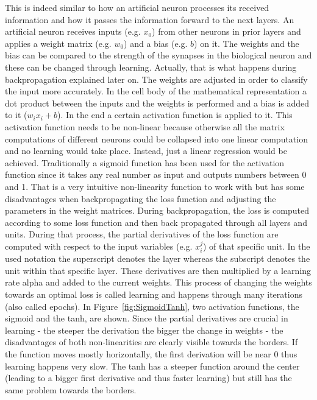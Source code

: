 This is indeed similar to how an artificial neuron processes its received information and how it passes the information forward to the next layers. An artificial neuron receives inputs (e.g. $x_0$) from other neurons in prior layers and applies a weight matrix (e.g. $w_0$) and a bias (e.g. $b$) on it. The weights and the bias can be compared to the strength of the synapses in the biological neuron and these can be changed through learning. Actually, that is what happens during backpropagation explained later on. The weights are adjusted in order to classify the input more accurately. In the cell body of the mathematical representation a dot product between the inputs and the weights is performed and a bias is added to it ($w_i x_i + b$). In the end a certain activation function is applied to it. This activation function needs to be non-linear because otherwise all the matrix computations of different neurons could be collapsed into one linear computation and no learning would take place. Instead, just a linear regression would be achieved.
Traditionally a sigmoid function has been used for the activation function since it takes any real number as input and outputs numbers between 0 and 1. That is a very intuitive non-linearity function to work with but has some disadvantages when backpropagating the loss function and adjusting the parameters in the weight matrices.  During backpropagation, the loss is computed according to some loss function and then back propagated through all layers and units. During that process, the partial derivatives of the loss function are computed with respect to the input variables (e.g. $x_i^j$) of that specific unit. In the used notation the superscript denotes the layer whereas the subscript denotes the unit within that specific layer. These derivatives are then multiplied by a learning rate alpha and added to the current weights. This process of changing the weights towards an optimal loss is called learning and happens through many iterations (also called epochs). In Figure~\ref{fig:SigmoidTanh}, two activation functions, the sigmoid and the tanh, are shown. Since the partial derivatives are crucial in learning - the steeper the derivation the bigger the change in weights - the disadvantages of both non-linearities are clearly visible towards the borders. If the function moves mostly horizontally, the first derivation will be near 0 thus learning happens very slow. The tanh has a steeper function around the center (leading to a bigger first derivative and thus faster learning) but still has the same problem towards the borders.\\


